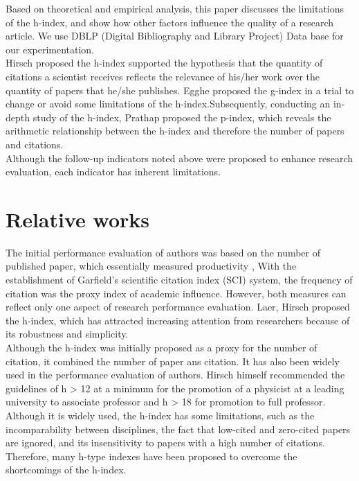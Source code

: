 \documentclass[times, twoside]{zHenriquesLab-StyleBioRxiv}
\begin{document}
Based on theoretical and empirical analysis, this paper discusses the limitations of the h-index, and show how other factors influence the quality of a research article. We use DBLP (Digital Bibliography and Library Project) Data base for our experimentation.\\

Hirsch proposed the h-index \cite{hirsch2005index} supported the hypothesis that the quantity of citations a scientist receives reflects the relevance of his/her work over the quantity of papers that he/she publishes. Egghe \cite{egghe2006theory} proposed the g-index in a trial to change or avoid some limitations of the h-index.Subsequently, conducting an in-depth study of the h-index, Prathap \cite{prathap2010there} proposed the p-index, which reveals the arithmetic relationship between the h-index and therefore the number of papers and citations.\\

Although the follow-up indicators noted above were proposed to enhance research evaluation, each indicator has inherent limitations.

\section*{Relative works}
The initial performance evaluation of authors was based on the number of published paper, which essentially measured productivity \cite{agarwal2016bibliometrics}, With the establishment of Garfield's scientific citation index (SCI) system, the frequency of citation was the proxy index of academic influence. However, both measures can reflect only one aspect of research performance evaluation. Laer, Hirsch \cite{hirsch2005index} proposed the h-index, which has attracted increasing attention from researchers because of its robustness and simplicity.\\

Although the h-index was initially proposed as a proxy for the number of citation, it combined the number of paper ans citation. It has also been widely used in the performance evaluation of authors. Hirsch himself \cite{hirsch2005index} recommended the guidelines of h > 12 at a minimum for the promotion of a physicist at a leading university to associate professor and h > 18 for promotion to full professor.\\

Although it is widely used, the h-index has some limitations, such as the incomparability between disciplines, the fact that low-cited and zero-cited papers are ignored, and its insensitivity to papers with a high number of citations. Therefore, many h-type indexes have been proposed to overcome the shortcomings of the h-index.\\
\end{document}
